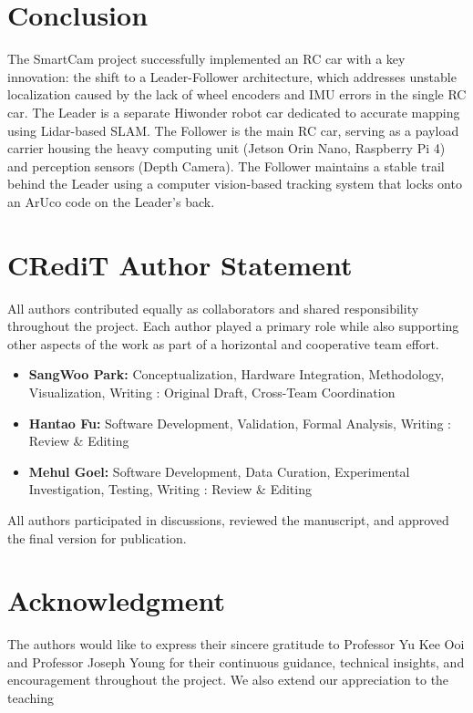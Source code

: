 \documentclass[journal,transmag]{IEEEtran}
\begin{document}
\section{Conclusion}
The SmartCam project successfully implemented an RC car with a key innovation: the shift to a Leader-Follower architecture, which addresses unstable localization caused by the lack of wheel encoders and IMU errors in the single RC car. The Leader is a separate Hiwonder robot car dedicated to accurate mapping using Lidar-based SLAM. The Follower is the main RC car, serving as a payload carrier housing the heavy computing unit (Jetson Orin Nano, Raspberry Pi 4) and perception sensors (Depth Camera). The Follower maintains a stable trail behind the Leader using a computer vision-based tracking system that locks onto an ArUco code on the Leader's back.

\section*{CRediT Author Statement}
\small
All authors contributed equally as collaborators and shared responsibility throughout the project.  
Each author played a primary role while also supporting other aspects of the work as part of a horizontal and cooperative team effort.

\begin{itemize}
    \item \textbf{SangWoo Park:} Conceptualization, Hardware Integration, Methodology, Visualization, Writing : Original Draft, Cross-Team Coordination  
    \item \textbf{Hantao Fu:} Software Development, Validation, Formal Analysis, Writing : Review \& Editing  
    \item \textbf{Mehul Goel:} Software Development, Data Curation, Experimental Investigation, Testing, Writing : Review \& Editing  
\end{itemize}

All authors participated in discussions, reviewed the manuscript, and approved the final version for publication.

\normalsize

\section*{Acknowledgment}
\small
The authors would like to express their sincere gratitude to Professor Yu Kee Ooi and Professor Joseph Young for their continuous guidance, technical insights, and encouragement throughout the project.  
We also extend our appreciation to the teaching
\end{document}
